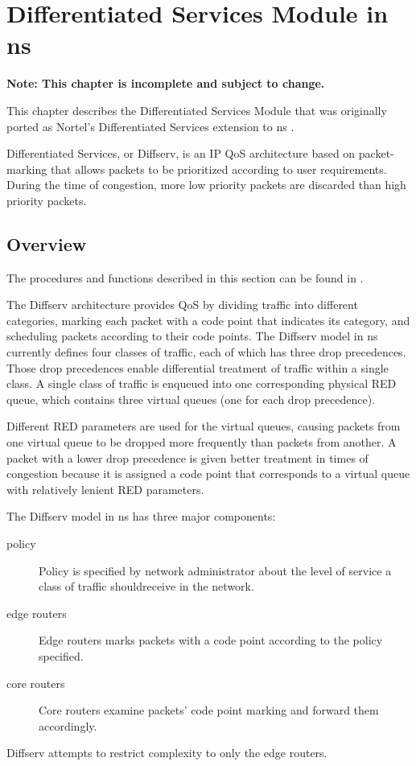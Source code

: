 %
%
%
\chapter{Differentiated Services Module in ns}
\label{chap:diffserv}


\textbf{Note: This chapter is incomplete and subject to change.}

This chapter describes the Differentiated Services Module that was originally 
ported as Nortel's Differentiated Services extension to ns \cite{Diffserv}.

Differentiated Services, or Diffserv, is an IP QoS architecture based on 
packet-marking that allows packets to be prioritized according to user 
requirements.  During the time of congestion, more low priority packets are 
discarded than high priority packets.

\section{Overview}
\label{sec:diffservoverview}

The procedures and functions described in this section can be found in
.

The Diffserv architecture provides QoS by dividing traffic into different 
categories, marking each packet with a code point that indicates its category, 
and scheduling packets according to their code points. The Diffserv model in ns 
currently defines four classes of traffic, each of which has three drop 
precedences.  Those drop precedences enable differential treatment of traffic 
within a single class. A single class of traffic is enqueued into one 
corresponding physical RED queue, which contains three virtual queues (one for
each drop precedence).

Different RED parameters are used for the virtual queues, causing packets from 
one virtual queue to be dropped more frequently than packets from another.  A 
packet with a lower drop precedence is given better treatment in times of 
congestion because it is assigned a code point that corresponds to a virtual 
queue with relatively lenient RED parameters.  

The Diffserv model in ns has three major components:
\begin{description}

\item [policy]
Policy is specified by network administrator about the level of service a class
of traffic shouldreceive in the network.  

\item [edge routers]
Edge routers marks packets with a code point according to the policy specified.

\item [core routers]
Core routers examine packets' code point marking and forward them accordingly.

\end{description}
Diffserv attempts to restrict complexity to only the edge routers.


